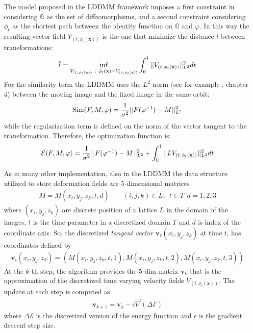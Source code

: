 The model proposed in the LDDMM framework imposes a first constraint in considering $\mathbb{G}$ as the set of diffeomorphisms, and a second constraint considering $\phi_{t}$ as the shortest path between the identity function on $\mathbb{G}$ and $\varphi$. In this way the resulting vector field $V_{(t,\phi_{t} (\mathbf{x}))}$ is the one that minimize the distance $l$ between transformations:
\begin{align*}
\hat{l} = \inf_{V_{(t,\phi_{t} (\mathbf{x}))} ~ : ~ \dot{\phi_{t}} (\mathbf{x}) = V_{(t,\phi_{t} (\mathbf{x}))}  
				       }
	\int_{0}^{1} \vert\lvert V_{(t,\phi_{t} (\mathbf{x}))} \rvert\vert_{L^2}^{2}dt
\end{align*}
For the similarity term the LDDMM uses the $L^{2}$ norm (see for example \cite{stein2009real}, chapter 4) between the moving image and the fixed image in the same orbit:
\begin{align*}
\text{Sim}(F,M,\varphi) = \frac{1}{\sigma^2}\vert\lvert F(\varphi^{-1})  - M   \rvert\vert_{L^{2}}^{2}
\end{align*}
while the regularization term is defined on the norm of the vector tangent to the transformation. Therefore, the optimization function is: 
\begin{align*}
\mathcal{E}(F, M, \varphi) 
= 
\frac{1}{\sigma^2}\vert\lvert F(\varphi^{-1})  - M   \rvert\vert_{L^{2}}^{2}
 +
\int_0^1 \vert\lvert L V_{(t,\phi_{t} (\mathbf{x}))}  \rvert\vert_{L^{2}}^{2} dt
\end{align*}

As in many other implementation, also in the LDDMM the data structure utilized to store deformation fields are 5-dimensional matrices
\begin{align}\label{eq:basic_data_structure}
M = M(x_i,y_j,z_k,t,d) \qquad (i,j,k)\in L , ~~ t \in T  ~~ d = 1,2,3
\end{align}
where $(x_i,y_j,z_k)$ are discrete position of a lattice $L$ in the domain of the images, $t$ is the time parameter in a discretized domain $T$ and $d$ is index of the coordinate axis. So, the discretized \emph{tangent vector} $\mathbf{v}_{\tau}(x_i,y_j,z_k)$ at time $t$, has coordinates defined by
\begin{align*}
\mathbf{v}_{t}(x_i,y_j,z_k) = (M(x_i,y_j,z_k,t ,1), M(x_i,y_j,z_k,t,2), M(x_i,y_j,z_k,t ,3))
\end{align*}
At the $k$-th step, the algorithm provides the 5-dim matrix $\mathbf{v}_{k}$ that is the approximation of the discretized time varying velocity fields $V_{(t,\phi_{t} (\mathbf{x}))}$. The update at each step is computed as
\begin{align*}
\mathbf{v}_{k+1} = \mathbf{v}_{k} - \epsilon \vec{\nabla} (\Delta\mathcal{E})
\end{align*}
where $\Delta\mathcal{E}$ is the discretized version of the energy function and $\epsilon$ is the gradient descent step size.\\

